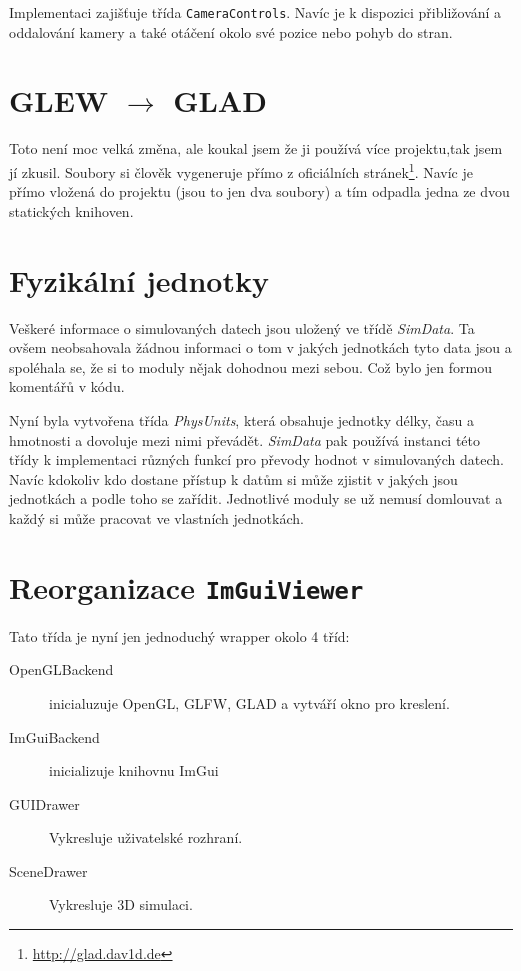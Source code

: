 Implementaci zajišťuje třída \texttt{CameraControls}. Navíc je k dispozici přibližování a oddalování kamery a také otáčení okolo své pozice nebo pohyb do stran.

\section{GLEW $ \rightarrow $ GLAD}

Toto není moc velká změna, ale koukal jsem že ji používá více projektu,tak jsem jí zkusil. Soubory si člověk vygeneruje přímo z oficiálních stránek\footnote{\url{http://glad.dav1d.de}}. Navíc je přímo vložená do projektu (jsou to jen dva soubory) a tím odpadla jedna ze dvou statických knihoven.

\section{Fyzikální jednotky}

Veškeré informace o simulovaných datech jsou uložený ve třídě \textit{SimData}. Ta ovšem neobsahovala žádnou informaci o tom v jakých jednotkách tyto data jsou a spoléhala se, že si to moduly nějak dohodnou mezi sebou. Což bylo jen formou komentářů v kódu.

Nyní byla vytvořena třída \textit{PhysUnits}, která obsahuje jednotky délky, času a hmotnosti a dovoluje mezi nimi převádět. \textit{SimData} pak používá instanci této třídy k implementaci různých funkcí pro převody hodnot v simulovaných datech. Navíc kdokoliv kdo dostane přístup k datům si může zjistit v jakých jsou jednotkách a podle toho se zařídit. Jednotlivé moduly se už nemusí domlouvat a každý si může pracovat ve vlastních jednotkách. 

\section{Reorganizace \texttt{ImGuiViewer}}
Tato třída je nyní jen jednoduchý wrapper okolo 4 tříd:
\begin{description}
	\item[OpenGLBackend] inicialuzuje OpenGL, GLFW, GLAD a vytváří okno pro kreslení.
	\item[ImGuiBackend] inicializuje knihovnu ImGui
	\item[GUIDrawer] Vykresluje uživatelské rozhraní.
	\item[SceneDrawer] Vykresluje 3D simulaci.
\end{description}

